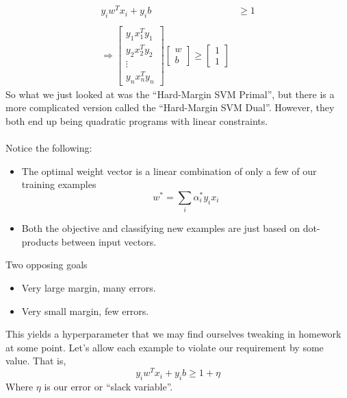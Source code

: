 \documentclass{article}
\theoremstyle{definition}
\begin{document}
\begin{align*}
    y_iw^T x_i + y_i b &\geq 1 \\\\
    \Longrightarrow \begin{bmatrix}
        y_1 x_1^T y_1 \\
        y_2 x_2^T y_2 \\
        \vdots \\
        y_n x_n^T y_n
    \end{bmatrix}\begin{bmatrix}
        w \\ b
    \end{bmatrix} \geq \begin{bmatrix}
        1 \\ 1
    \end{bmatrix}
\end{align*}
So what we just looked at was the ``Hard-Margin SVM Primal'', but there is a more complicated version
called the ``Hard-Margin SVM Dual''. However, they both end up being quadratic programs with linear constraints.
\\\\
Notice the following:
\begin{itemize}
    \item The optimal weight vector is a linear combination of only a few of our training examples
    \[
    w^* = \sum_{i} \alpha_i^*y_ix_i
    \]
    \item Both the objective and classifying new examples are just based on dot-products between input vectors.
\end{itemize}
Two opposing goals
\begin{itemize}
    \item Very large margin, many errors.
    \item Very small margin, few errors.
\end{itemize}
This yields a hyperparameter that we may find ourselves tweaking in homework at some point.
Let's allow each example to violate our requirement by some value. That is,
\[
    y_iw^T x_i + y_i b \geq 1 + \eta
    \]
Where $\eta$ is our error or ``slack variable''.
\end{document}
